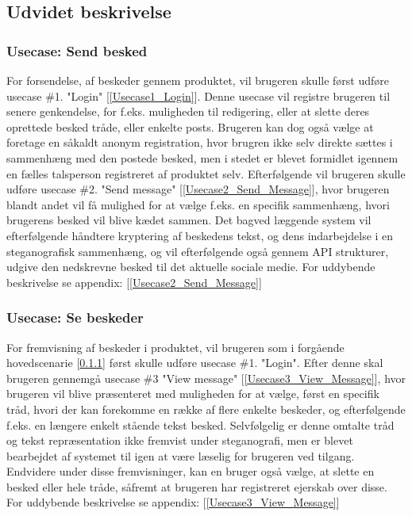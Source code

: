 \subsection{Udvidet beskrivelse}
\subsubsection{Usecase: Send besked}
\label{Hovedscenarie1}
For forsendelse, af beskeder gennem produktet, vil brugeren skulle først udføre usecase \#1. "Login" [\ref{Usecase1_Login}]. Denne usecase vil registre brugeren til senere genkendelse, for f.eks. muligheden til redigering, eller at slette deres oprettede besked tråde, eller enkelte posts. Brugeren kan dog også vælge at foretage en såkaldt anonym registration, hvor brugren ikke selv direkte sættes i sammenhæng med den postede besked, men i stedet er blevet formidlet igennem en fælles talsperson registreret af produktet selv. Efterfølgende vil brugeren skulle udføre usecase \#2. "Send message" [\ref{Usecase2_Send_Message}], hvor brugeren blandt andet vil få mulighed for at vælge f.eks. en specifik sammenhæng, hvori brugerens besked vil blive kædet sammen. Det bagved læggende system vil efterfølgende håndtere kryptering af beskedens tekst, og dens indarbejdelse i en steganografisk sammenhæng, og vil efterfølgende også gennem API strukturer, udgive den nedskrevne besked til det aktuelle sociale medie. For uddybende beskrivelse se appendix: [\ref{Usecase2_Send_Message}]
\newpage

\subsubsection{Usecase: Se beskeder}
\label{Hovedscenarie2}
For fremvisning af beskeder i produktet, vil brugeren som i forgående hovedscenarie [\ref{Hovedscenarie1}] først skulle udføre usecase \#1. "Login". Efter denne skal brugeren gennemgå usecase \#3 "View message" [\ref{Usecase3_View_Message}], hvor brugeren vil blive præsenteret med muligheden for at vælge, først en specifik tråd, hvori der kan forekomme en række af flere enkelte beskeder, og efterfølgende f.eks. en længere enkelt stående tekst besked.
Selvfølgelig er denne omtalte tråd og tekst repræsentation ikke fremvist under steganografi, men er blevet bearbejdet af systemet til igen at være læselig for brugeren ved tilgang.
Endvidere under disse fremvisninger, kan en bruger også vælge, at slette en besked eller hele tråde, såfremt at brugeren har registreret ejerskab over disse. For uddybende beskrivelse se appendix: [\ref{Usecase3_View_Message}]

